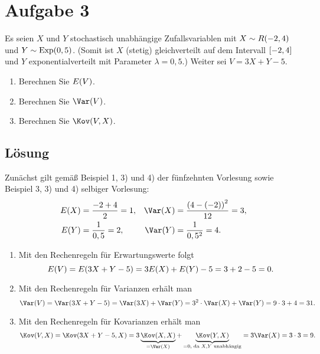 \documentclass{exercise}
\begin{document}
    \section*{Aufgabe 3}
    
    \begin{problem}
        Es seien \(X\) und \(Y\) stochastisch unabhängige Zufallsvariablen mit \(X \sim R\parentheses*{-2, 4}\) und \(Y \sim \Exp\parentheses*{0,5}\).
        (Somit ist \(X\) (stetig) gleichverteilt auf dem Intervall \(\brackets*{-2, 4}\) und \(Y\) exponentialverteilt mit Parameter \(\lambda = 0,5\).)
        Weiter sei \(V = 3X + Y - 5\).
        \begin{enumerate}
            \item Berechnen Sie \(E\parentheses*{V}\).
            \item Berechnen Sie \(\Var\parentheses*{V}\).
            \item Berechnen Sie \(\Kov\parentheses*{V, X}\).
        \end{enumerate}
    \end{problem}
    
    \subsection*{Lösung}
    Zunächst gilt gemäß Beispiel 1, 3) und 4) der fünfzehnten Vorlesung sowie Beispiel 3, 3) und 4) selbiger Vorlesung:
    \begin{align*}
        E\parentheses*{X} &= \frac{-2 + 4}{2} = 1, & \Var\parentheses*{X} &= \frac{\parentheses*{4 - \parentheses*{-2}}^2}{12} = 3,\\
        E\parentheses*{Y} &= \frac{1}{0,5} = 2, & \Var\parentheses*{Y} &= \frac{1}{0,5^2} = 4.
    \end{align*}
    \begin{enumerate}
        \item Mit den Rechenregeln für Erwartungswerte folgt
        \[
            E\parentheses*{V} = E\parentheses*{3X + Y - 5} = 3E\parentheses*{X} + E\parentheses*{Y} - 5 = 3 + 2 - 5 = 0.
        \]
        \item Mit den Rechenregeln für Varianzen erhält man
        \[
            \Var\parentheses*{V} = \Var\parentheses*{3X + Y - 5} = \Var\parentheses*{3X} + \Var\parentheses*{Y} = 3^2 \cdot \Var\parentheses*{X} + \Var\parentheses*{Y} = 9 \cdot 3 + 4 = 31.
        \]
        \item Mit den Rechenregeln für Kovarianzen erhält man
        \[
            \Kov\parentheses*{V, X} = \Kov\parentheses*{3X + Y - 5, X} = 3\underbrace{\Kov\parentheses*{X, X}}_{= \Var\parentheses*{X}} + \underbrace{\Kov\parentheses*{Y, X}}_{= 0\text{, da }X, Y\text{ unabhängig}} = 3\Var\parentheses*{X} = 3 \cdot 3 = 9.
        \]
    \end{enumerate}
\end{document}
